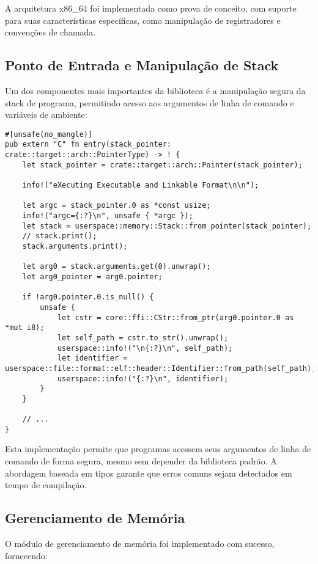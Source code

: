 \documentclass[12pt,a4paper]{article}
\begin{document}
A arquitetura x86\_64 foi implementada como prova de conceito, com suporte para suas características específicas, como manipulação de registradores e convenções de chamada.

\subsection{Ponto de Entrada e Manipulação de Stack}

Um dos componentes mais importantes da biblioteca é a manipulação segura da stack de programa, permitindo acesso aos argumentos de linha de comando e variáveis de ambiente:

\begin{lstlisting}
#[unsafe(no_mangle)]
pub extern "C" fn entry(stack_pointer: crate::target::arch::PointerType) -> ! {
    let stack_pointer = crate::target::arch::Pointer(stack_pointer);

    info!("eXecuting Executable and Linkable Format\n\n");

    let argc = stack_pointer.0 as *const usize;
    info!("argc={:?}\n", unsafe { *argc });
    let stack = userspace::memory::Stack::from_pointer(stack_pointer);
    // stack.print();
    stack.arguments.print();

    let arg0 = stack.arguments.get(0).unwrap();
    let arg0_pointer = arg0.pointer;

    if !arg0.pointer.0.is_null() {
        unsafe {
            let cstr = core::ffi::CStr::from_ptr(arg0.pointer.0 as *mut i8);
            let self_path = cstr.to_str().unwrap();
            userspace::info!("\n{:?}\n", self_path);
            let identifier = userspace::file::format::elf::header::Identifier::from_path(self_path);
            userspace::info!("{:?}\n", identifier);
        }
    }

    // ...
}
\end{lstlisting}

Esta implementação permite que programas acessem seus argumentos de linha de comando de forma segura, mesmo sem depender da biblioteca padrão. A abordagem baseada em tipos garante que erros comuns sejam detectados em tempo de compilação.

\subsection{Gerenciamento de Memória}

O módulo de gerenciamento de memória foi implementado com sucesso, fornecendo:
\end{document}
